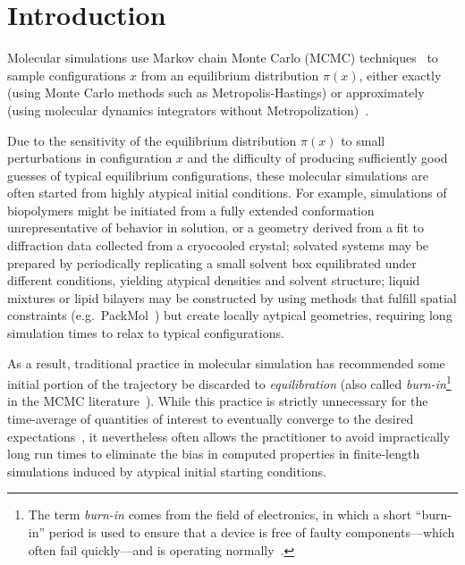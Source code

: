 \documentclass[aps,pre,twocolumn,nofootinbib,superscriptaddress,linenumbers,11point]{revtex4-1}
\begin{document}
\section*{Introduction}
\label{section:introduction}

Molecular simulations use Markov chain Monte Carlo (MCMC) techniques~\cite{jun-s-liu:mcmc} to sample configurations $x$ from an equilibrium distribution $\pi(x)$, either exactly (using Monte Carlo methods such as Metropolis-Hastings) or approximately (using molecular dynamics integrators without Metropolization)~\cite{sivak:2013:prx:vvvr}.

Due to the sensitivity of the equilibrium distribution $\pi(x)$ to small perturbations in configuration $x$ and the difficulty of producing sufficiently good guesses of typical equilibrium configurations, these molecular simulations are often started from highly atypical initial conditions.
For example, simulations of biopolymers might be initiated from a fully extended conformation unrepresentative of behavior in solution, or a geometry derived from a fit to diffraction data collected from a cryocooled crystal; 
solvated systems may be prepared by periodically replicating a small solvent box equilibrated under different conditions, yielding atypical densities and solvent structure; 
liquid mixtures or lipid bilayers may be constructed by using methods that fulfill spatial constraints (e.g.~PackMol~\cite{martinez:jctc:2009:packmol}) but create locally aytpical geometries, requiring long simulation times to relax to typical configurations.

As a result, traditional practice in molecular simulation has recommended some initial portion of the trajectory be discarded to \emph{equilibration} (also called \emph{burn-in}\footnote{The term \emph{burn-in} comes from the field of electronics, in which a short ``burn-in'' period is used to ensure that a device is free of faulty components---which often fail quickly---and is operating normally~\cite{crc-mcmc-handbook}.} in the MCMC literature~\cite{crc-mcmc-handbook}).
While this practice is strictly unnecessary for the time-average of quantities of interest to eventually converge to the desired expectations~\cite{geyer:burn-in-unnecessary,crc-mcmc-handbook}, it nevertheless often allows the practitioner to avoid impractically long run times to eliminate the bias in computed properties in finite-length simulations induced by atypical initial starting conditions.
\end{document}
